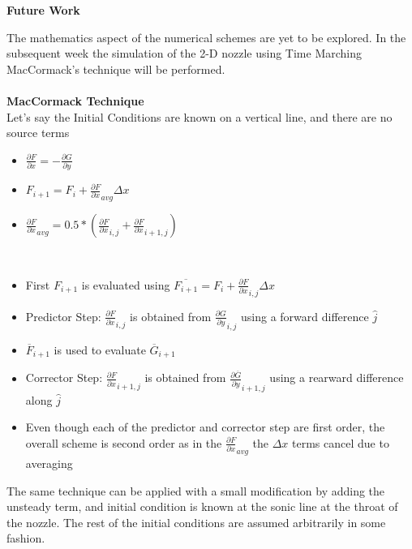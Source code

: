 \documentclass[12pt,a4paper]{article}
\begin{document}
\begin{flushleft}
{\bf \huge Future Work} \\[1em] 
\end{flushleft}
The mathematics aspect of the numerical schemes are yet to be explored. In the subsequent week the simulation of the 2-D nozzle using Time Marching MacCormack's technique will be performed. \\
\\
\textbf{MacCormack Technique}\\
Let's say the Initial Conditions are known on a vertical line, and there are no source terms
\begin{itemize}
\setlength\itemsep{0.01em}
    \item $\frac{\partial F}{\partial x} = -\frac{\partial G}{\partial y} $
    \item $ F_{i+1} = F_{i} + \frac{\partial F}{\partial x}_{avg}\Delta x  $
    \item $\frac{\partial F}{\partial x}_{avg} = 0.5*(\frac{\partial F}{\partial x}_{i,j}+\frac{\partial F}{\partial x}_{i+1,j}) $
\end{itemize}
\\
\begin{itemize}
\setlength\itemsep{0.01em}
    \item First $ F_{i+1}$ is evaluated using $ \overline{F_{i+1}} = F_{i} + \frac{\partial F}{\partial x}_{i,j}\Delta x  $
    \item Predictor Step: $\frac{\partial F}{\partial x}_{i,j}$ is obtained from $\frac{\partial G}{\partial y}_{i,j} $ using a forward difference $\hat{j}$
    \item $\overline{F}_{i+1}$ is used to evaluate $\overline{G}_{i+1}$
    \item Corrector Step: $\frac{\partial F}{\partial x}_{i+1,j}$ is obtained from  $\frac{\partial \overline{G}}{\partial y}_{i+1,j} $ using a rearward difference along $\hat{j}$
    \item Even though each of the predictor and corrector step are first order, the overall scheme is second order as in the $\frac{\partial F}{\partial x}_{avg}$ the $\Delta x$ terms cancel due to averaging
\end{itemize}
The same technique can be applied with a small modification by adding the unsteady term, and initial condition is known at the sonic line at the throat of the nozzle. The rest of the initial conditions are assumed arbitrarily in some fashion. \\
\end{document}
